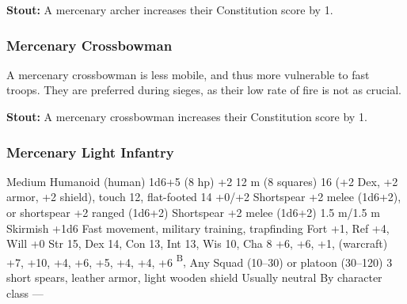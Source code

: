 \textbf{Stout:} A mercenary archer increases their Constitution score by 1.

\subsubsection{Mercenary Crossbowman}

A mercenary crossbowman is less mobile, and thus more vulnerable to fast troops. They are preferred during sieges, as their low rate of fire is not as crucial.

\textbf{Stout:} A mercenary crossbowman increases their Constitution score by 1.

\subsubsection{Mercenary Light Infantry}
\begin{MonsterStats}
{Medium Humanoid (human)}
{1d6+5 (8 hp)}
{+2}
{12 m (8 squares)}
{16 (+2 Dex, +2 armor, +2 shield), touch 12, flat-footed 14}
{+0/+2}
{Shortspear +2 melee (1d6+2), or shortspear +2 ranged (1d6+2)}
{Shortspear +2 melee (1d6+2)}
{1.5 m/1.5 m}
{Skirmish +1d6}
{Fast movement, military training, trapfinding}
{Fort +1, Ref +4, Will +0}
{Str 15, Dex 14, Con 13, Int 13, Wis 10, Cha 8}
{
     +6,
     +6,
     +1,
     (warcraft) +7,
     +10,
     +4,
     +6,
     +5,
     +4,
     +4,
     +6
}
{
    \textsuperscript{B},
}
{Any}
{Squad (10--30) or platoon (30--120)}
{\onehalf}
{
    3 short spears,
    leather armor,
    light wooden shield
}
{Usually neutral}
{By character class}
{---}
\end{MonsterStats}

